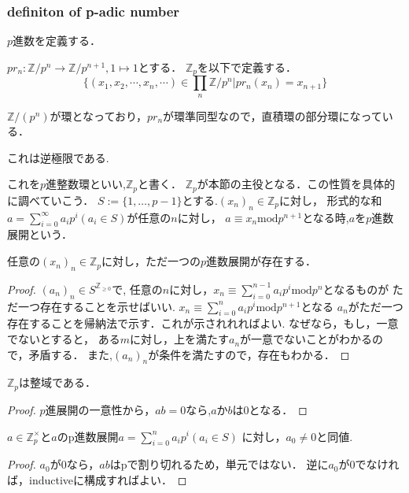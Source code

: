 \documentclass{ujarticle}
\begin{document}
\subsubsection{definiton of p-adic number}
\label{sub:definiton of p-adic number}
$p$進数を定義する．

\begin{dfn}
$pr_n:\mathbb{Z}/p^n \to \mathbb{Z}/p^{n+1},1 \mapsto 1$とする．
$\mathbb{Z}_p$を以下で定義する．
\begin{equation*}
 \{ (x_1,x_2,\cdots,x_n,\cdots) \in \prod_{n} \mathbb{Z}/p^n | pr_n(x_n)=x_{n+1} \}
\end{equation*}
\end{dfn}
$\mathbb{Z}/(p^n)$が環となっており，$pr_n$が環準同型なので，直積環の部分環になっている．
\begin{rem}
 これは逆極限である.
\end{rem}
これを$p$進整数環といい,$\mathbb{Z}_p$と書く．
$\mathbb{Z}_p$が本節の主役となる．この性質を具体的に調べていこう．
$S:=\{ 1 ,\dots ,p-1 \}$とする.$(x_n)_n \in \mathbb{Z}_p$に対し，
形式的な和$a= \sum_{i=0}^{\infty} a_ip^i(a_i \in S)$が任意の$n$に対し，
$a \equiv x_n \mbox{mod} p^{n+1}$となる時,$a$を$p$進数展開という．

\begin{prop}
 任意の$(x_n)_n \in \mathbb{Z}_p$に対し，ただ一つの$p$進数展開が存在する．
\end{prop}

\begin{proof}
  $(a_n)_n \in S^{\mathbb{Z}_{\ge 0}}$で,
  任意の$n$に対し，$x_n \equiv \sum_{i=0}^{n-1} a_ip^i \mbox{mod}p^n$となるものが
  ただ一つ存在することを示せばいい.
  $x_n \equiv \sum_{i=0}^{n}a_ip^i \mbox{mod}p^{n+1}$となる
  $a_n$がただ一つ存在することを帰納法で示す．これが示されれればよい.
  なぜなら，もし，一意でないとすると，
  ある$m$に対し，上を満たす$a_n$が一意でないことがわかるので，矛盾する．
  また,$(a_n)_n$が条件を満たすので，存在もわかる．
\end{proof}

\begin{cor}
 $\mathbb{Z}_p$は整域である．
\end{cor}
\begin{proof}
  $p$進展開の一意性から，$ab=0$なら,$a$か$b$は0となる．
\end{proof}
\begin{cor}
 $a \in \mathbb{Z}_p^{\times}$と$a$のp進数展開$a = \sum_{i=0}^n a_ip^i(a_i \in S)$
に対し，$a_0 \neq 0$と同値.
\end{cor}
\begin{proof}
  $a_0$が0なら，$ab$はpで割り切れるため，単元ではない．
  逆に$a_0$が0でなければ，inductiveに構成すればよい．
\end{proof}
\end{document}
